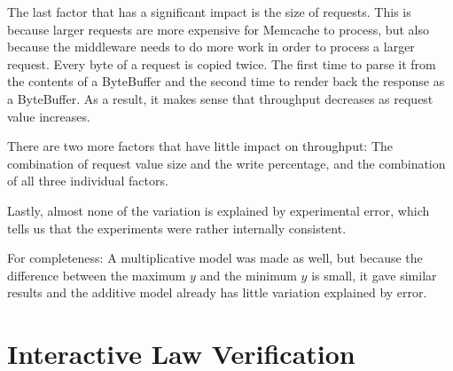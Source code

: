 \documentclass[11pt]{article}
\begin{document}
The last factor that has a significant impact is the size of requests.
This is because larger requests are more expensive for Memcache to process, but also because the middleware needs to do more work in order to process a larger request.
Every byte of a request is copied twice.
The first time to parse it from the contents of a ByteBuffer and the second time to render back the response as a ByteBuffer.
As a result, it makes sense that throughput decreases as request value increases.

There are two more factors that have little impact on throughput: The combination of request value size and the write percentage, and the combination of all three individual factors.

Lastly, almost none of the variation is explained by experimental error, which tells us that the experiments were rather internally consistent.

For completeness: A multiplicative model was made as well, but because the difference between the maximum $y$ and the minimum $y$ is small, it gave similar results and the additive model already has little variation explained by error.

% 
% 
% 

\section{Interactive Law Verification}\label{sec:interactive-law}
\end{document}
